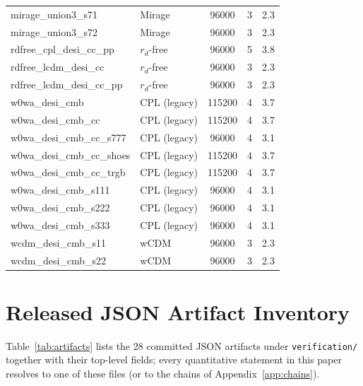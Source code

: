\documentclass[aps,prd,preprint,superscriptaddress,nofootinbib]{revtex4-2}
\begin{document}
\begin{table}[h]
\begin{ruledtabular}
\begin{tabular}{llccc}
mirage\_union3\_s71 & Mirage & 96000 & 3 & 2.3 \\
mirage\_union3\_s72 & Mirage & 96000 & 3 & 2.3 \\
rdfree\_cpl\_desi\_cc\_pp & $r_d$-free & 96000 & 5 & 3.8 \\
rdfree\_lcdm\_desi\_cc & $r_d$-free & 96000 & 3 & 2.3 \\
rdfree\_lcdm\_desi\_cc\_pp & $r_d$-free & 96000 & 3 & 2.3 \\
w0wa\_desi\_cmb & CPL (legacy) & 115200 & 4 & 3.7 \\
w0wa\_desi\_cmb\_cc & CPL (legacy) & 115200 & 4 & 3.7 \\
w0wa\_desi\_cmb\_cc\_s777 & CPL (legacy) & 96000 & 4 & 3.1 \\
w0wa\_desi\_cmb\_cc\_shoes & CPL (legacy) & 115200 & 4 & 3.7 \\
w0wa\_desi\_cmb\_cc\_trgb & CPL (legacy) & 115200 & 4 & 3.7 \\
w0wa\_desi\_cmb\_s111 & CPL (legacy) & 96000 & 4 & 3.1 \\
w0wa\_desi\_cmb\_s222 & CPL (legacy) & 96000 & 4 & 3.1 \\
w0wa\_desi\_cmb\_s333 & CPL (legacy) & 96000 & 4 & 3.1 \\
wcdm\_desi\_cmb\_s11 & wCDM & 96000 & 3 & 2.3 \\
wcdm\_desi\_cmb\_s22 & wCDM & 96000 & 3 & 2.3 \\
\end{tabular}
\end{ruledtabular}
\end{table}

\section{Released JSON Artifact Inventory}
\label{app:artifacts}

Table~\ref{tab:artifacts} lists the 28 committed JSON artifacts under \texttt{verification/} together with their top-level fields; every quantitative statement in this paper resolves to one of these files (or to the chains of Appendix~\ref{app:chains}).
\end{document}
